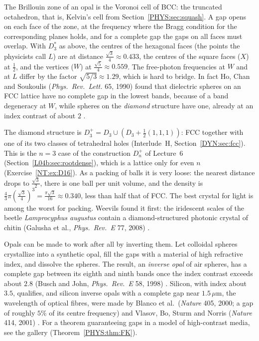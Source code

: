 The Brillouin zone of an opal is the Voronoi cell of BCC: the truncated octahedron, that is,
Kelvin's cell from Section~\ref{PHYS:sec:squash}. A gap opens on each face of the zone, at the frequency where
the Bragg condition for the corresponding planes holds, and for a complete gap the gaps on all faces must
overlap. With $D_3^*$ as above, the centres of the hexagonal faces (the points the physicists call $L$) are
at distance $\frac{\sqrt3}4\approx0.433$, the centres of the square faces ($X$) at $\frac12$, and the
vertices ($W$) at $\frac{\sqrt5}4\approx0.559$. The free-photon frequencies at $W$ and at $L$ differ by the factor
$\sqrt{5/3}\approx1.29$, which is hard to bridge. In fact Ho, Chan and Soukoulis (\emph{Phys.\ Rev.\ Lett.} 65,
1990) found that dielectric spheres on an FCC lattice have no complete gap in the lowest bands, because
of a band degeneracy at $W$, while spheres on the \emph{diamond} structure have one, already at an
index contrast of about $2$ .

The diamond structure is $D_3^+=D_3\cup(D_3+\frac12(1,1,1))$: FCC together with one of its two classes of
tetrahedral holes (Interlude~H, Section~\ref{DYN:sec:fcc}). This is the $n=3$ case of the construction
$D_n^+$ of Lecture~6 (Section~\ref{L04b:sec:rootdense}), which is a lattice only for even $n$
(Exercise~\ref{NT:ex:D16}). As a packing of balls it is very loose: the nearest distance drops to
$\frac{\sqrt3}2$, there is one ball per unit volume, and the density is
$\frac43\pi(\frac{\sqrt3}4)^3=\frac{\pi\sqrt3}{16}\approx0.340$, less than half that of FCC. The best crystal
for light is among the worst for packing. Weevils found it first: the iridescent scales of the beetle
\emph{Lamprocyphus augustus} contain a diamond-structured photonic crystal of chitin (Galusha et al.,
\emph{Phys.\ Rev.~E} 77, 2008) .

Opals can be made to work after all by inverting them. Let colloidal spheres crystallize into a synthetic
opal, fill the gaps with a material of high refractive index, and dissolve the spheres. The result, an
\emph{inverse opal} of air spheres, has a complete gap between its eighth and ninth bands once the index
contrast exceeds about $2.8$ (Busch and John, \emph{Phys.\ Rev.~E} 58, 1998) .
Silicon, with index about $3.5$, qualifies, and silicon inverse opals with a complete gap near
$1.5\,\mu$m, the wavelength of optical fibres, were made by Blanco et al.\ (\emph{Nature} 405, 2000; a gap of
roughly $5\%$ of its centre frequency) and Vlasov, Bo, Sturm and Norris (\emph{Nature} 414, 2001) .
For a theorem guaranteeing gaps in a model of high-contrast media, see the gallery
(Theorem~\ref{PHYS:thm:FK}).

